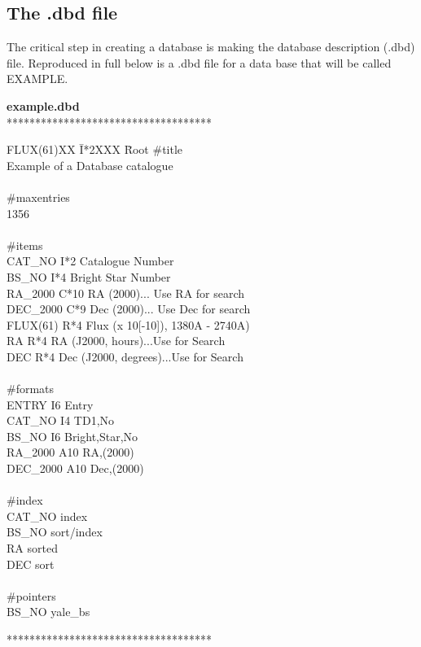 \subsection{The .dbd file}
The critical step in creating a database is making the database description
(.dbd) file.  Reproduced in full below is a .dbd file for a data base that will
be called EXAMPLE.
\begin{center}
{\bf example.dbd} \\
************************************
\end{center}
\begin{tabbing}
FLUX(61)XX \= I*2XXX \= Root   \kill
\#title     \\
Example of a Database catalogue \\
\>  \>  \\ 
\#maxentries   \\
1356            \\
\>  \>  \\ 
\#items       \\
CAT\_NO    \>   I*2  \>   Catalogue Number  \\
BS\_NO     \>   I*4  \>   Bright Star Number \\
RA\_2000   \>   C*10 \>   RA (2000)... Use RA for search  \\
DEC\_2000  \>   C*9  \>   Dec (2000)... Use Dec for search  \\
FLUX(61)   \>   R*4  \>   Flux (x 10[-10]), 1380A - 2740A) \\
RA         \>   R*4  \>   RA (J2000, hours)...Use for Search          \\
DEC        \>   R*4  \>   Dec (J2000, degrees)...Use for Search       \\
 \> \> \\
\#formats       \\
ENTRY       \>   I6   \>   Entry               \\
CAT\_NO     \>   I4   \>   TD1,No             \\
BS\_NO      \>   I6   \>   Bright,Star,No    \\
RA\_2000   \>   A10  \>   RA,(2000)          \\
DEC\_2000   \>   A10  \>   Dec,(2000)         \\
 \> \> \\
\#index  \\
CAT\_NO    \>     index  \\
BS\_NO     \>     sort/index       \\
RA         \>     sorted      \\
DEC        \>     sort        \\
 \> \> \\
\#pointers                  \\
BS\_NO     \>      yale\_bs    \\ 
\end{tabbing}
\begin{center}
************************************
\end{center}

